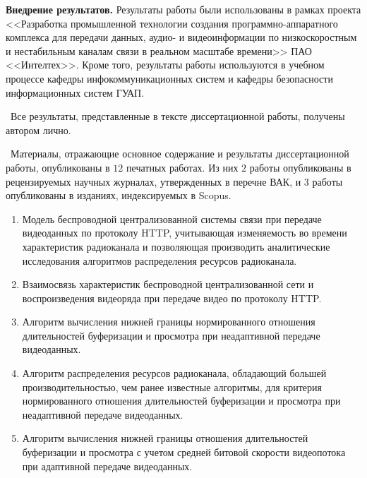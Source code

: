 \textbf{Внедрение результатов.} Результаты работы были использованы в рамках проекта <<Разработка промышленной технологии создания программно-аппаратного комплекса для передачи данных, аудио- и видеоинформации по низкоскоростным и нестабильным каналам связи в реальном масштабе времени>> ПАО <<Интелтех>>. Кроме того, результаты работы используются в учебном процессе кафедры инфокоммуникационных систем и кафедры безопасности информационных систем ГУАП.

\contribution\ Все результаты, представленные в тексте диссертационной работы, получены автором лично.

\publications\ Материалы, отражающие основное содержание и результаты диссертационной работы, опубликованы в $12$ печатных работах. Из них $2$ работы опубликованы в рецензируемых научных журналах, утвержденных в перечне ВАК, и $3$ работы опубликованы в изданиях, индексируемых в Scopus.

\begin{enumerate}
    \item Модель беспроводной централизованной системы связи при передаче видеоданных по протоколу HTTP, учитывающая изменяемость во времени характеристик радиоканала и позволяющая производить аналитические исследования алгоритмов распределения ресурсов радиоканала.
    \item Взаимосвязь характеристик беспроводной централизованной сети и воспроизведения видеоряда при передаче видео по протоколу HTTP.
    \item Алгоритм вычисления нижней границы нормированного отношения длительностей буферизации и просмотра при неадаптивной передаче видеоданных.
    \item Алгоритм распределения ресурсов радиоканала, обладающий большей производительностью, чем ранее известные алгоритмы, для критерия нормированного отношения длительностей буферизации и просмотра при неадаптивной передаче видеоданных.
    \item Алгоритм вычисления нижней границы отношения длительностей буферизации и просмотра с учетом средней битовой скорости видеопотока при адаптивной передаче видеоданных.
\end{enumerate}
